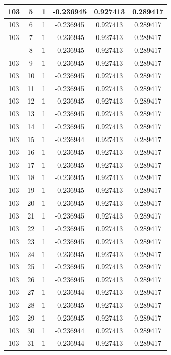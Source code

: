 \documentclass[12pt,a4paper]{article}
\numberwithin{equation}{section}
\numberwithin{figure}{section}
\numberwithin{table}{section}
\begin{document}
\begin{longtable}{|c|c|c|c|c|c|}
103 & 5 & 1 & -0.236945 & 0.927413 & 0.289417 \\ \hline
103 & 6 & 1 & -0.236945 & 0.927413 & 0.289417 \\ \hline
103 & 7 & 1 & -0.236945 & 0.927413 & 0.289417 \\ \hline
\pagebreak
103 & 8 & 1 & -0.236945 & 0.927413 & 0.289417 \\ \hline
103 & 9 & 1 & -0.236945 & 0.927413 & 0.289417 \\ \hline
103 & 10 & 1 & -0.236945 & 0.927413 & 0.289417 \\ \hline
103 & 11 & 1 & -0.236945 & 0.927413 & 0.289417 \\ \hline
103 & 12 & 1 & -0.236945 & 0.927413 & 0.289417 \\ \hline
103 & 13 & 1 & -0.236945 & 0.927413 & 0.289417 \\ \hline
103 & 14 & 1 & -0.236945 & 0.927413 & 0.289417 \\ \hline
103 & 15 & 1 & -0.236944 & 0.927413 & 0.289417 \\ \hline
103 & 16 & 1 & -0.236945 & 0.927413 & 0.289417 \\ \hline
103 & 17 & 1 & -0.236945 & 0.927413 & 0.289417 \\ \hline
103 & 18 & 1 & -0.236945 & 0.927413 & 0.289417 \\ \hline
103 & 19 & 1 & -0.236945 & 0.927413 & 0.289417 \\ \hline
103 & 20 & 1 & -0.236945 & 0.927413 & 0.289417 \\ \hline
103 & 21 & 1 & -0.236945 & 0.927413 & 0.289417 \\ \hline
103 & 22 & 1 & -0.236945 & 0.927413 & 0.289417 \\ \hline
103 & 23 & 1 & -0.236945 & 0.927413 & 0.289417 \\ \hline
103 & 24 & 1 & -0.236945 & 0.927413 & 0.289417 \\ \hline
103 & 25 & 1 & -0.236945 & 0.927413 & 0.289417 \\ \hline
103 & 26 & 1 & -0.236945 & 0.927413 & 0.289417 \\ \hline
103 & 27 & 1 & -0.236944 & 0.927413 & 0.289417 \\ \hline
103 & 28 & 1 & -0.236945 & 0.927413 & 0.289417 \\ \hline
103 & 29 & 1 & -0.236945 & 0.927413 & 0.289417 \\ \hline
103 & 30 & 1 & -0.236944 & 0.927413 & 0.289417 \\ \hline
103 & 31 & 1 & -0.236944 & 0.927413 & 0.289417 \\ \hline

\end{longtable}
\end{document}
